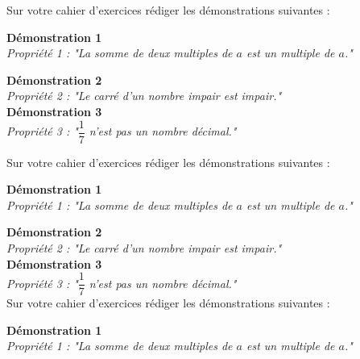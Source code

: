 \documentclass[a4paper,12pt]{article}
\begin{document}
\newpage
\vspace*{0.5cm}

Sur votre cahier d'exercices rédiger les démonstrations suivantes :

\vspace*{0.5cm}

\textbf{Démonstration 1}\\
\textit{Propriété 1 : "La somme de deux multiples de $a$ est un multiple de $a$."}

\vspace*{0.5cm}


\textbf{Démonstration 2}\\
\textit{Propriété 2 : "Le carré d'un nombre impair est impair."}\\



\textbf{Démonstration 3}\\
\textit{Propriété 3 : "$\dfrac{1}{7}$ n'est pas un nombre décimal."}\\

\vspace*{0.5cm}
\vspace*{0.5cm}

Sur votre cahier d'exercices rédiger les démonstrations suivantes :
\vspace*{0.5cm}

\textbf{Démonstration 1}\\
\textit{Propriété 1 : "La somme de deux multiples de $a$ est un multiple de $a$."}

\vspace*{0.5cm}

\textbf{Démonstration 2}\\
\textit{Propriété 2 : "Le carré d'un nombre impair est impair."}\\



\textbf{Démonstration 3}\\
\textit{Propriété 3 : "$\dfrac{1}{7}$ n'est pas un nombre décimal."}\\
\vspace*{0.5cm}
\vspace*{0.5cm}
Sur votre cahier d'exercices rédiger les démonstrations suivantes :
\vspace*{0.5cm}


\textbf{Démonstration 1}\\
\textit{Propriété 1 : "La somme de deux multiples de $a$ est un multiple de $a$."}

\vspace*{0.5cm}
\end{document}
